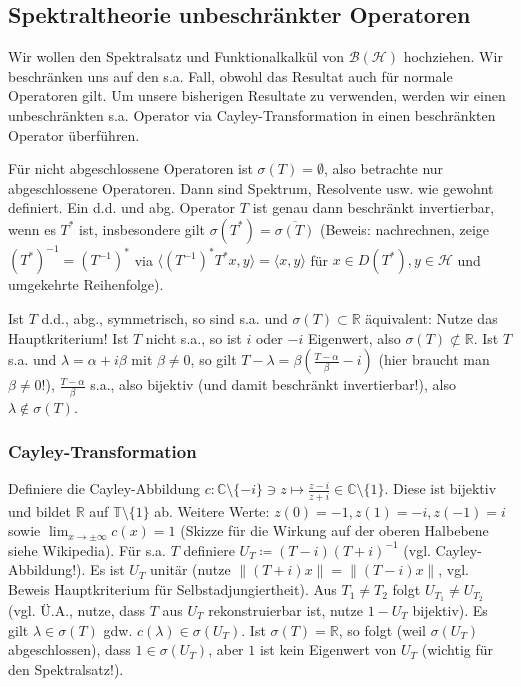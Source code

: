 \documentclass[11pt,a4paper]{scrartcl}
\newcommand{\R}{\mathbb{R}} %
\newcommand{\C}{\mathbb{C}} %
\newcommand{\Hc}{\mathcal{H}}
\newcommand{\B}{\mathcal{B}}
\theoremstyle{plain}
\theoremstyle{definition}
\theoremstyle{remark}
\begin{document}

\subsection{Spektraltheorie unbeschränkter Operatoren}

Wir wollen den Spektralsatz und Funktionalkalkül von $\B(\Hc)$ hochziehen. Wir beschränken uns auf den s.a. Fall, obwohl das Resultat auch für normale Operatoren gilt. Um unsere bisherigen Resultate zu verwenden, werden wir einen unbeschränkten s.a. Operator via Cayley-Transformation in einen beschränkten Operator überführen.

Für nicht abgeschlossene Operatoren ist $\sigma(T)=\emptyset$, also betrachte nur abgeschlossene Operatoren. Dann sind Spektrum, Resolvente usw. wie gewohnt definiert. Ein d.d. und abg. Operator $T$ ist genau dann beschränkt invertierbar, wenn es $T^*$ ist, insbesondere gilt $\sigma(T^*)=\overline{\sigma(T)}$ (Beweis: nachrechnen, zeige $(T^*)^{-1}=(T^{-1})^*$ via $\langle (T^{-1})^*T^*x,y \rangle = \langle x, y \rangle$ für $x\in D(T^*), y\in \Hc$ und umgekehrte Reihenfolge).

Ist $T$ d.d., abg., symmetrisch, so sind s.a. und $\sigma(T)\subset \R$ äquivalent: Nutze das Hauptkriterium! Ist $T$ nicht s.a., so ist $i$ oder $-i$ Eigenwert, also $\sigma(T) \not\subset \R$. Ist $T$ s.a. und $\lambda=\alpha + i\beta$ mit $\beta\neq 0$, so gilt $T-\lambda = \beta(\frac{T-\alpha}{\beta}-i)$ (hier braucht man $\beta\neq 0$!), $\frac{T-\alpha}{\beta}$ s.a., also bijektiv (und damit beschränkt invertierbar!), also $\lambda \not\in \sigma(T)$.

\subsubsection{Cayley-Transformation}

Definiere die Cayley-Abbildung $c: \C\setminus \{-i\} \ni z \mapsto \frac{z-i}{z+i} \in \C\setminus \{1\}$. Diese ist bijektiv und bildet $\R$ auf $\mathbb{T} \setminus \{1\}$ ab. Weitere Werte: $z(0)=-1, z(1)=-i, z(-1)=i$ sowie $\lim_{x\to \pm \infty} c(x) = 1$ (Skizze für die Wirkung auf der oberen Halbebene siehe Wikipedia). Für s.a. $T$ definiere $U_T\coloneqq (T-i)(T+i)^{-1}$ (vgl. Cayley-Abbildung!). Es ist $U_T$ unitär (nutze $\|(T+i)x\|=\|(T-i)x\|$, vgl. Beweis Hauptkriterium für Selbstadjungiertheit). Aus $T_1\neq T_2$ folgt $U_{T_1}\neq U_{T_2}$ (vgl. Ü.A., nutze, dass $T$ aus $U_T$ rekonstruierbar ist, nutze $1-U_T$ bijektiv). Es gilt $\lambda\in \sigma(T)$ gdw. $c(\lambda)\in \sigma(U_T)$. Ist $\sigma(T)=\R$, so folgt (weil $\sigma(U_T)$ abgeschlossen), dass $1\in \sigma(U_T)$, aber $1$ ist kein Eigenwert von $U_T$ (wichtig für den Spektralsatz!).
\end{document}
